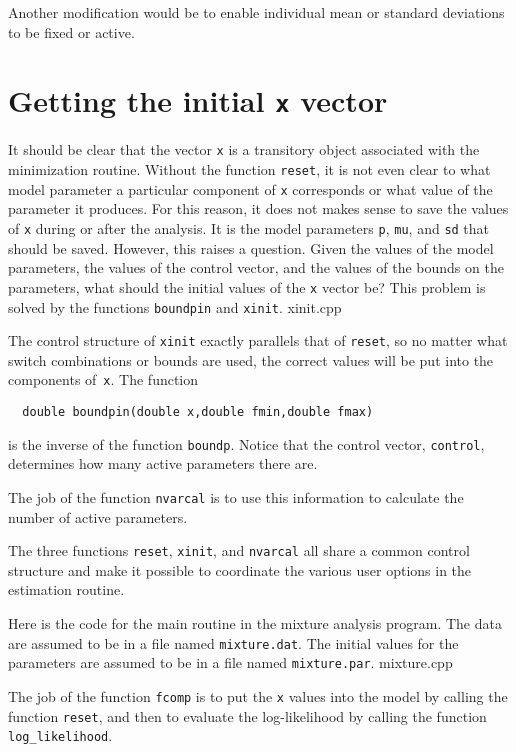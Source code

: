 \documentclass{admbmanual}
\begin{document}
Another modification would be to enable individual mean or standard deviations
to be fixed or active.

\section{Getting the initial \texttt{x} vector}

It should be clear that the vector \texttt{x} is a transitory object associated
with the minimization routine. Without the function \texttt{reset}, it is not
even clear to what model parameter a particular component of \texttt{x}
corresponds or what value of the parameter it produces. For this reason, it does
not makes sense to save the values of \texttt{x} during or after the analysis.
It is the model parameters \texttt{p}, \texttt{mu}, and \texttt{sd} that should
be saved. However, this raises a question. Given the values of the model
parameters, the values of the control vector, and the values of the bounds on
the parameters, what should the initial values of the \texttt{x} vector be? This
problem is solved by the functions \texttt{boundpin} and \texttt{xinit}. 
xinit.cpp

The control structure of \texttt{xinit} exactly parallels that of
\texttt{reset}, so no matter what switch combinations or bounds are used, the
correct values will be put into the components of~\texttt{x}. The function
\begin{lstlisting}
  double boundpin(double x,double fmin,double fmax)
\end{lstlisting}
is the inverse of the function \texttt{boundp}. Notice that the control vector,
\texttt{control}, determines how many active parameters there are.

The job of the function \texttt{nvarcal} is to use this information to calculate
the number of active parameters.


The three functions \texttt{reset}, \texttt{xinit}, and \texttt{nvarcal} all
share a common control structure and make it possible to coordinate the various
user options in the estimation routine.

Here is the code for the main routine in the mixture analysis program. The data
are assumed to be in a file named \texttt{mixture.dat}. The initial values for
the parameters are assumed to be in a file named \texttt{mixture.par}. 
mixture.cpp

The job of the function \texttt{fcomp} is to put the \texttt{x} values into the
model by calling the function \texttt{reset}, and then to evaluate the
log-likelihood by calling the function \texttt{log\_likelihood}.

\end{document}
